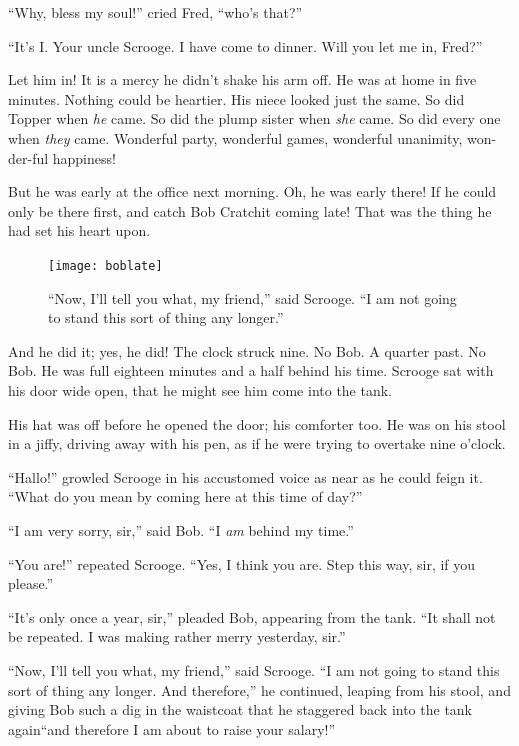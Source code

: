 \documentclass[paper=5.5in:8.5in,BCOR=10mm,twoside,DIV=15,12pt,usegeometry,openany]{scrbook} %
\begin{document}
\enquote{Why, bless my soul!} cried Fred, \enquote{who's that?}



\enquote{It's I. Your uncle Scrooge. I have come to dinner. Will you let me in, Fred?}

Let him in! It is a mercy he didn't shake his arm off. He was at home in five minutes. Nothing could be heartier. His niece looked just the same. So did Topper when \textit{he} came. So did the plump sister when \textit{she} came. So did every one when \textit{they} came. Wonderful party, wonderful games, wonderful unanimity, won-der-ful happiness!

But he was early at the office next morning. Oh, he was early there! If he could only be there first, and catch Bob Cratchit coming late! That was the thing he had set his heart upon.

\begin{figure}[p]
\begin{minipage}[c]{\linewidth}
\texttt{[image: boblate]}
\caption*{\enquote{Now, I'll tell you what, my friend,} said Scrooge. \enquote{I am not going to stand this sort of thing any longer.}}
\end{minipage}
\end{figure}

And he did it; yes, he did! The clock struck nine. No Bob. A quarter past. No Bob. He was full eighteen minutes and a half behind his time. Scrooge sat with his door wide open, that he might see him come into the tank.

His hat was off before he opened the door; his comforter too. He was on his stool in a jiffy, driving away with his pen, as if he were trying to overtake nine o'clock.

\enquote{Hallo!} growled Scrooge in his accustomed voice as near as he could feign it. \enquote{What do you mean by coming here at this time of day?}

\enquote{I am very sorry, sir,} said Bob. \enquote{I \textit{am} behind my time.}

\enquote{You are!} repeated Scrooge. \enquote{Yes, I think you are. Step this way, sir, if you please.}

\enquote{It's only once a year, sir,} pleaded Bob, appearing from the tank. \enquote{It shall not be repeated. I was making rather merry yesterday, sir.}

\enquote{Now, I'll tell you what, my friend,} said Scrooge. \enquote{I am not going to stand this sort of thing any longer. And therefore,} he continued, leaping from his stool, and giving Bob such a dig in the waistcoat that he staggered back into the tank again\textemdash \enquote{and therefore I am about to raise your salary!}
\end{document}
